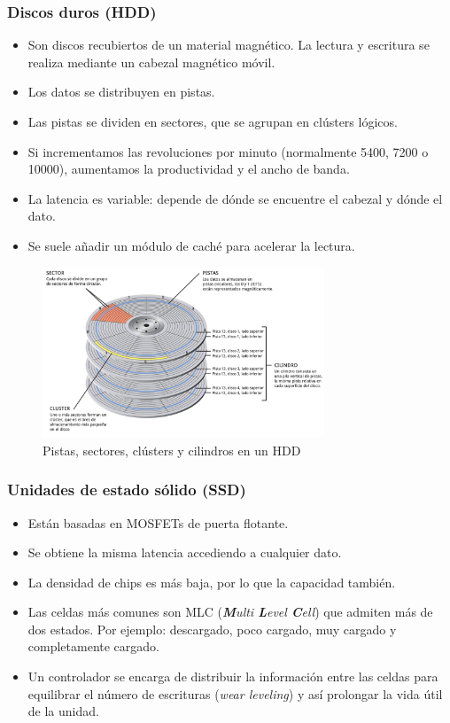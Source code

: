 \documentclass[12pt,spanish]{article}
\begin{document}
\subsubsection{Discos duros (HDD)}
\begin{itemize}
	\item Son discos recubiertos de un material magnético. La lectura y escritura se realiza mediante un cabezal magnético móvil.
	\item Los datos se distribuyen en pistas.
	\item Las pistas se dividen en sectores, que se agrupan en clústers lógicos.
	\item Si incrementamos las revoluciones por minuto (normalmente 5400, 7200 o 10000), aumentamos la productividad y el ancho de banda.
	\item La latencia es variable: depende de dónde se encuentre el cabezal y dónde el dato.
	\item Se suele añadir un módulo de caché para acelerar la lectura.
\end{itemize}

\begin{figure}[H]
	\centering
	\includegraphics[width=0.75\textwidth]{hddparts.png}
	\caption{Pistas, sectores, clústers y cilindros en un HDD}
\end{figure}

\subsubsection{Unidades de estado sólido (SSD)}
\begin{itemize}
	\item Están basadas en MOSFETs de puerta flotante.
	\item Se obtiene la misma latencia accediendo a cualquier dato.
	\item La densidad de chips es más baja, por lo que la capacidad también.
	\item Las celdas más comunes son MLC (\textit{\textbf{M}ulti \textbf{L}evel \textbf{C}ell}) que admiten más de dos estados. Por ejemplo: descargado, poco cargado, muy cargado y completamente cargado.
	\item Un controlador se encarga de distribuir la información entre las celdas para equilibrar el número de escrituras (\textit{wear leveling}) y así prolongar la vida útil de la unidad.
\end{itemize}
\end{document}
